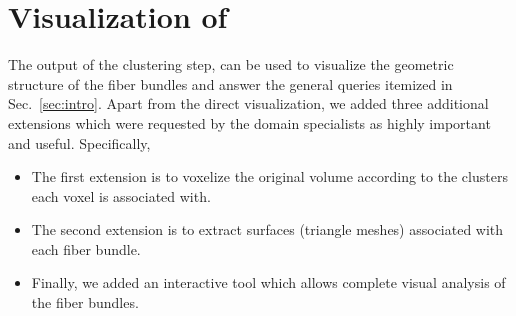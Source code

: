 \section{Visualization of \mt}
\label{sec:vis}
The output of the clustering step, can be used to visualize the geometric structure of the fiber bundles and answer the general queries itemized in Sec.~\ref{sec:intro}. Apart from the direct \mt visualization, we added three additional extensions which were requested by the domain specialists as highly important and useful. Specifically, 
\begin{itemize}[noitemsep,nolistsep]
	\item The first extension is to voxelize the original volume according to the clusters each voxel is associated with.
	\item The second extension is to extract surfaces (triangle meshes) associated with each fiber bundle. 
	\item Finally, we added an interactive tool which allows complete visual analysis of the fiber bundles. 
\end{itemize}
